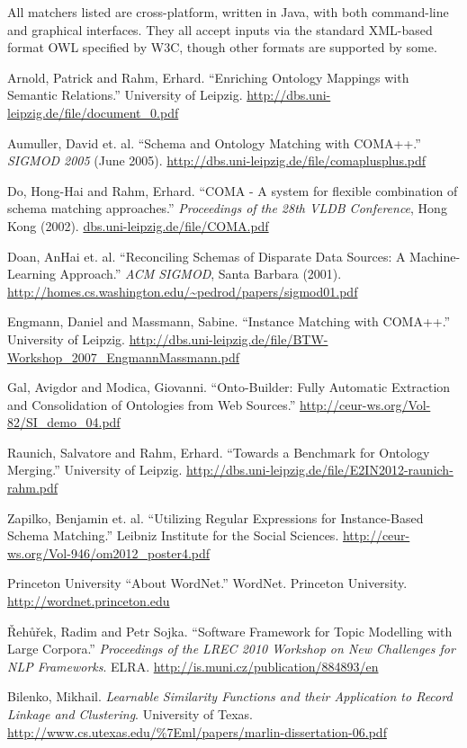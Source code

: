 \documentclass{datamade}
\theoremstyle{definition}
\theoremstyle{remark}
\begin{document}
All matchers listed are cross-platform, written in Java, with both command-line and graphical interfaces. They all accept inputs via the standard XML-based format OWL specified by W3C, though other formats are supported by some. 

\begin{thebibliography}{9}
	Arnold, Patrick and Rahm, Erhard.
	``Enriching Ontology Mappings with Semantic Relations.''
	University of Leipzig.
	\url{http://dbs.uni-leipzig.de/file/document_0.pdf}	

	Aumuller, David et. al.
	``Schema and Ontology Matching with COMA++.''
	\emph{SIGMOD 2005} (June 2005). 
	\url{http://dbs.uni-leipzig.de/file/comaplusplus.pdf}
	
	Do, Hong-Hai and Rahm, Erhard.
	``COMA - A system for flexible combination of schema matching approaches.''
	\emph{Proceedings of the 28th VLDB Conference}, Hong Kong (2002).
	\url{dbs.uni-leipzig.de/file/COMA.pdf}
	
	Doan, AnHai et. al.
	``Reconciling Schemas of Disparate Data Sources: A
        Machine-Learning Approach.'' \emph{ACM SIGMOD}, Santa Barbara (2001).
	\url{http://homes.cs.washington.edu/~pedrod/papers/sigmod01.pdf}
	
	Engmann, Daniel and Massmann, Sabine.
	``Instance Matching with COMA++.''
	University of Leipzig.
	\url{ http://dbs.uni-leipzig.de/file/BTW-Workshop_2007_EngmannMassmann.pdf}
	
	Gal, Avigdor and Modica, Giovanni.
	``Onto-Builder: Fully Automatic Extraction and Consolidation of Ontologies from Web Sources.''
	\url{http://ceur-ws.org/Vol-82/SI_demo_04.pdf}

	Raunich, Salvatore and Rahm, Erhard.
	``Towards a Benchmark for Ontology Merging.''
	University of Leipzig.
	\url{http://dbs.uni-leipzig.de/file/E2IN2012-raunich-rahm.pdf}

	Zapilko, Benjamin et. al. 
	``Utilizing Regular Expressions for Instance-Based Schema Matching.''
	Leibniz Institute for the Social Sciences.
	\url{http://ceur-ws.org/Vol-946/om2012_poster4.pdf}

        Princeton University ``About WordNet.'' WordNet. Princeton
        University. \url{http://wordnet.princeton.edu}

        {\v R}eh{\r u}{\v r}ek, Radim and Petr Sojka. ``Software
        Framework for Topic Modelling with Large Corpora.''
        \emph{Proceedings of the LREC 2010 Workshop on New Challenges
          for NLP
          Frameworks}. ELRA. \url{http://is.muni.cz/publication/884893/en}
        

       Bilenko, Mikhail. \emph{Learnable Similarity Functions
        and their Application to Record Linkage and
        Clustering}. University of Texas. \url{http://www.cs.utexas.edu/%7Eml/papers/marlin-dissertation-06.pdf}
        
\end{thebibliography}
\end{document}
